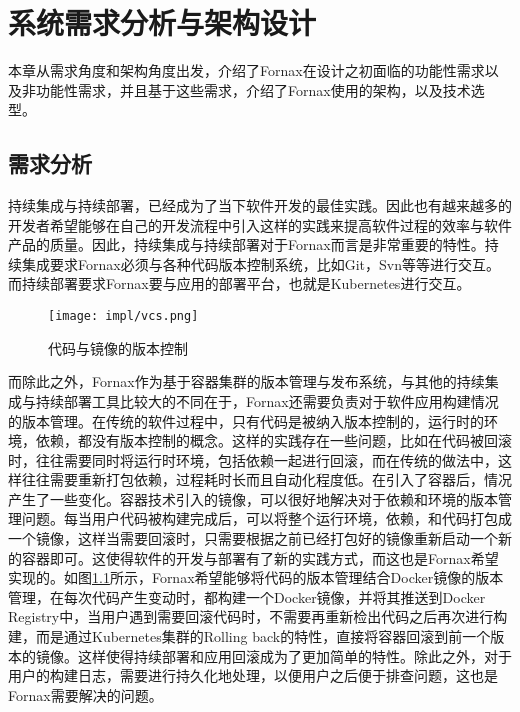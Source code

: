 
\chapter{系统需求分析与架构设计}
\label{chap:impl}

本章从需求角度和架构角度出发，介绍了Fornax在设计之初面临的功能性需求以及非功能性需求，并且基于这些需求，介绍了Fornax使用的架构，以及技术选型。

\section{需求分析}

持续集成与持续部署，已经成为了当下软件开发的最佳实践。因此也有越来越多的开发者希望能够在自己的开发流程中引入这样的实践来提高软件过程的效率与软件产品的质量。因此，持续集成与持续部署对于Fornax而言是非常重要的特性。持续集成要求Fornax必须与各种代码版本控制系统，比如Git，Svn等等进行交互。而持续部署要求Fornax要与应用的部署平台，也就是Kubernetes进行交互。

\begin{figure}[!htp]
  \centering
  \texttt{[image: impl/vcs.png]}
  \caption{代码与镜像的版本控制}
  \label{fig:vcs-code}
\end{figure}

而除此之外，Fornax作为基于容器集群的版本管理与发布系统，与其他的持续集成与持续部署工具比较大的不同在于，Fornax还需要负责对于软件应用构建情况的版本管理。在传统的软件过程中，只有代码是被纳入版本控制的，运行时的环境，依赖，都没有版本控制的概念。这样的实践存在一些问题，比如在代码被回滚时，往往需要同时将运行时环境，包括依赖一起进行回滚，而在传统的做法中，这样往往需要重新打包依赖，过程耗时长而且自动化程度低。在引入了容器后，情况产生了一些变化。容器技术引入的镜像，可以很好地解决对于依赖和环境的版本管理问题。每当用户代码被构建完成后，可以将整个运行环境，依赖，和代码打包成一个镜像，这样当需要回滚时，只需要根据之前已经打包好的镜像重新启动一个新的容器即可。这使得软件的开发与部署有了新的实践方式，而这也是Fornax希望实现的。如图\ref{fig:vcs-code}所示，Fornax希望能够将代码的版本管理结合Docker镜像的版本管理，在每次代码产生变动时，都构建一个Docker镜像，并将其推送到Docker Registry中，当用户遇到需要回滚代码时，不需要再重新检出代码之后再次进行构建，而是通过Kubernetes集群的Rolling back的特性，直接将容器回滚到前一个版本的镜像。这样使得持续部署和应用回滚成为了更加简单的特性。除此之外，对于用户的构建日志，需要进行持久化地处理，以便用户之后便于排查问题，这也是Fornax需要解决的问题。

